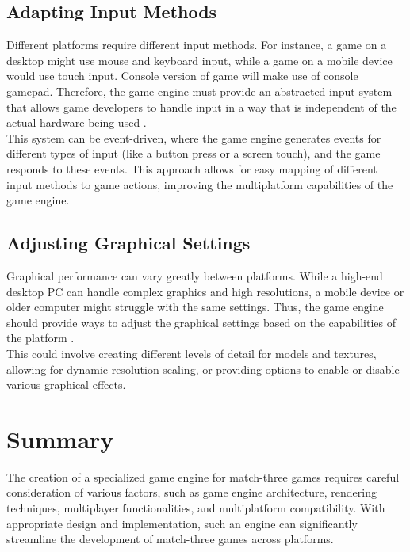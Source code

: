 \documentclass[runningheads, 12pt]{llncs}
\begin{document}
\subsection{Adapting Input Methods}
Different platforms require different input methods. For instance, a game on a desktop might use mouse and keyboard input, while a game on a mobile device would use touch input. Console version of game will make use of console gamepad. Therefore, the game engine must provide an abstracted input system that allows game developers to handle input in a way that is independent of the actual hardware being used \cite{ref_book4}.
\\
This system can be event-driven, where the game engine generates events for different types of input (like a button press or a screen touch), and the game responds to these events. This approach allows for easy mapping of different input methods to game actions, improving the multiplatform capabilities of the game engine.

\subsection{Adjusting Graphical Settings}
Graphical performance can vary greatly between platforms. While a high-end desktop PC can handle complex graphics and high resolutions, a mobile device or older computer might struggle with the same settings. Thus, the game engine should provide ways to adjust the graphical settings based on the capabilities of the platform \cite{ref_book5}.
\\ 
This could involve creating different levels of detail for models and textures, allowing for dynamic resolution scaling, or providing options to enable or disable various graphical effects.


\section{Summary}
The creation of a specialized game engine for match-three games requires careful consideration of various factors, such as game engine architecture, rendering techniques, multiplayer functionalities, and multiplatform compatibility. With appropriate design and implementation, such an engine can significantly streamline the development of match-three games across platforms.
\end{document}

